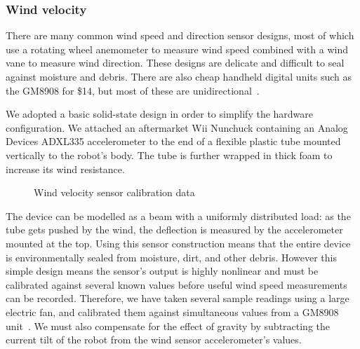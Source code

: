     \subsubsection*{Wind velocity}
There are many common wind speed and direction sensor designs, most of which use a rotating wheel anemometer to measure wind speed combined with a wind vane to measure wind direction. These designs are delicate and difficult to seal against moisture and debris. There are also cheap handheld digital units such as the \textsc{GM8908} for \$14, but most of these are unidirectional~\cite{gm8908}.

We adopted a basic solid-state design in order to simplify the hardware configuration. We attached an aftermarket Wii Nunchuck containing an Analog Devices \textsc{ADXL335} accelerometer to the end of a flexible plastic tube mounted vertically to the robot's body. The tube is further wrapped in thick foam to increase its wind resistance.

\begin{figure}[h]
    \centering
    \scriptsize
    
    \caption{Wind velocity sensor calibration data}
\end{figure}


The device can be modelled as a beam with a uniformly distributed load: as the tube gets pushed by the wind, the deflection is measured by the accelerometer mounted at the top. Using this sensor construction means that the entire device is environmentally sealed from moisture, dirt, and other debris. However this simple design means the sensor's output is highly nonlinear and must be calibrated against several known values before useful wind speed measurements can be recorded. Therefore, we have taken several sample readings using a large electric fan, and calibrated them against simultaneous values from a \textsc{GM8908} unit~\cite{gm8908}. We must also compensate for the effect of gravity by subtracting the current tilt of the robot from the wind sensor accelerometer's values.

